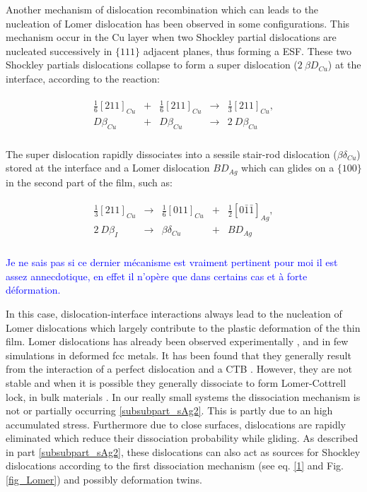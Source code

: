 \documentclass[final,3p,times,twocolumn]{elsarticle}
\begin{document}
Another mechanism of dislocation recombination which can leads to the nucleation of Lomer dislocation has been observed in some configurations. This mechanism occur in the Cu layer when two Shockley partial dislocations are nucleated successively in $\lbrace111\rbrace$ adjacent planes, thus forming a ESF. These two Shockley partials dislocations collapse to form a super dislocation ($ 2~\beta D_{Cu} $) at the interface, according to the reaction:

\begin{eqnarray}\label{3}
	\begin{array}{ccccc}
\frac{1}{6}\left[211\right]_{Cu} &+& \frac{1}{6}\left[211\right]_{Cu} &\rightarrow& \frac{1}{3}\left[211\right]_{Cu}, \\
D\beta_{Cu} &+& D\beta_{Cu} &\rightarrow & 2~D\beta_{Cu} \\
	\end{array}
\end{eqnarray}

The super dislocation rapidly dissociates into a sessile stair-rod dislocation ($\beta\delta_{Cu}$) stored at the interface and a Lomer dislocation $ BD_{Ag} $ which can glides on a $\lbrace100\rbrace$ in the second part of the film, such as:

\begin{eqnarray}\label{2}
	\begin{array}{ccccc}
\frac{1}{3}\left[211\right]_{Cu} &\rightarrow & \frac{1}{6}\left[011\right]_{Cu} &+& \frac{1}{2}\left[0\bar{1}\bar{1}\right]_{Ag}, \\
2~D\beta_{I} &\rightarrow & \beta\delta_{Cu} &+& BD_{Ag} \\
	\end{array}
\end{eqnarray}

\textcolor{blue}{Je ne sais pas si ce dernier mécanisme est vraiment pertinent pour moi il est assez annecdotique, en effet il n'opère que dans certains cas et à forte déformation.}  

In this case, dislocation-interface interactions always lead to the nucleation of Lomer dislocations which largely contribute to the plastic deformation of the thin film. Lomer dislocations has already been observed experimentally \cite{bonneville90PML,mills89PMA}, and in few simulations in deformed fcc metals. It has been found that they generally result from the interaction of a perfect dislocation and a CTB \cite{sansoz07NL,wu09AM}. However, they are not stable and when it is possible they generally dissociate to form Lomer-Cottrell lock, in bulk materials \cite{hirth82book,wu09AM}. In our really small systems the dissociation mechanism is not or partially occurring \ref{subsubpart_sAg2}. This is partly due to an high accumulated stress. %
Furthermore due to close surfaces, dislocations are rapidly eliminated which reduce their dissociation probability while gliding. As described in part \ref{subsubpart_sAg2}, these dislocations can also act as sources for Shockley dislocations according to the first dissociation mechanism (see eq. \ref{1} and Fig. \ref{fig_Lomer}) and possibly deformation twins. 
\end{document}
